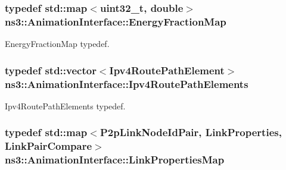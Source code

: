 \subsubsection[{\texorpdfstring{Energy\+Fraction\+Map}{EnergyFractionMap}}]{\setlength{\rightskip}{0pt plus 5cm}typedef std\+::map$<$uint32\+\_\+t, double$>$ {\bf ns3\+::\+Animation\+Interface\+::\+Energy\+Fraction\+Map}\hspace{0.3cm}{\ttfamily [private]}}\hypertarget{classns3_1_1AnimationInterface_a868459efb0dd7edd1ec83d7c0f8cd365}{}\label{classns3_1_1AnimationInterface_a868459efb0dd7edd1ec83d7c0f8cd365}


Energy\+Fraction\+Map typedef. 

\subsubsection[{\texorpdfstring{Ipv4\+Route\+Path\+Elements}{Ipv4RoutePathElements}}]{\setlength{\rightskip}{0pt plus 5cm}typedef std\+::vector$<${\bf Ipv4\+Route\+Path\+Element}$>$ {\bf ns3\+::\+Animation\+Interface\+::\+Ipv4\+Route\+Path\+Elements}\hspace{0.3cm}{\ttfamily [private]}}\hypertarget{classns3_1_1AnimationInterface_a7c7711cf651506df80a9eb3026603c52}{}\label{classns3_1_1AnimationInterface_a7c7711cf651506df80a9eb3026603c52}


Ipv4\+Route\+Path\+Elements typedef. 

\subsubsection[{\texorpdfstring{Link\+Properties\+Map}{LinkPropertiesMap}}]{\setlength{\rightskip}{0pt plus 5cm}typedef std\+::map$<${\bf P2p\+Link\+Node\+Id\+Pair}, {\bf Link\+Properties}, {\bf Link\+Pair\+Compare}$>$ {\bf ns3\+::\+Animation\+Interface\+::\+Link\+Properties\+Map}\hspace{0.3cm}{\ttfamily [private]}}\hypertarget{classns3_1_1AnimationInterface_a6b801c7635367ab676b45b476ea3902c}{}\label{classns3_1_1AnimationInterface_a6b801c7635367ab676b45b476ea3902c}


